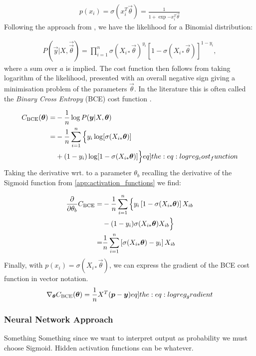         \begin{align*}
            p(x_i) = \sigma(x_i^T \vec{\theta}) = \frac{1}{1+\exp{-x_i^T\vec{\theta}}}
        \end{align*}
        Following the approach from \citep{Project1}, we have the likelihood for a Binomial distribution:      

        \begin{align*}
            P(\vec{y}|X,\vec{\vec{\theta}}) = \prod_{i = 1}^{n} \sigma(X_{i*}\vec{\theta})^{y_i}[1-\sigma(X_{i*}\vec{\theta})]^{1 - y_i},
        \end{align*}
        where a sum over $a$ is implied. The cost function then follows from taking logarithm of the likelihood, presented with an overall negative sign giving a minimisation problem of the parameters $\vec{\theta}$. In the literature this is often called the \textit{Binary Cross Entropy} (BCE) cost function \citep{BCE}.  

        \begin{align}
            \msub{C}{BCE}(\vec{\theta}) =& - \frac{1}{n} \log P(\vec{y}|X,\vec{\vec{\theta}}) \nonumber \\ \nonumber
            =& - \frac{1}{n} \sum_{i = 1}^{n} \Big\{ y_i \log[\sigma(X_{i*}\vec{\theta})] \\
            &+ (1 - y_i)\log[1-\sigma(X_{i*}\vec{\theta})] \Big\}
            \label[eq]{the:eq:logreg_cost_function}
        \end{align}
        Taking the derivative wrt. to a parameter $\theta_b$ recalling the derivative of the Sigmoid function from \cref{app:activation_functions} we find:

        \begin{align} \nonumber
            \pdv{\theta_b} \msub{C}{BCE} =& - \frac{1}{n} \sum_{i = 1}^{n} \Big\{ y_i \bclosed{1-\sigma(X_{i*}\vec{\theta})}X_{ib} \\ \nonumber
            &- (1-y_i)\sigma(X_{i*}\vec{\theta})X_{ib}  \Big\} \\
            =& \frac{1}{n}\sum_{i=1}^n \bclosed{\sigma(X_{i*}\vec{\theta}) - y_i}X_{ib}
        \end{align}
        Finally, with $p(x_i) = \sigma(X_{i*}\vec{\theta})$, we can express the gradient of the BCE cost function in vector notation.
        \begin{align}
            \nabla_{\vec{\theta}} \msub{C}{BCE}(\vec{\theta}) = \frac{1}{n}X^T (\vec{p} - \vec{y}) 
            \label[eq]{the:eq:logreg_gradient}
        \end{align}


    \subsubsection{Neural Network Approach}
        Something Something since we want to interpret output as probability we must choose Sigmoid. Hidden activation functions can be whatever. 